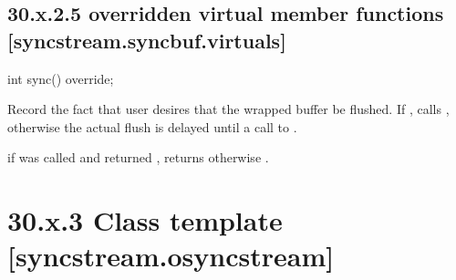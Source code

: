 \documentclass[ebook,11pt,article]{memoir}
\begin{document}
\subsection{30.x.2.5  overridden virtual member functions [syncstream.syncbuf.virtuals]}


\begin{addedblock}
\begin{itemdecl}
int sync() override;
\end{itemdecl}
\begin{itemdescr}
\pnum
\effects 
Record the fact that user desires that the wrapped buffer be flushed. 
If , calls , otherwise
the actual flush is delayed until a call to .

\pnum
\returns
if  was called and returned , returns  otherwise .
\end{itemdescr}

\end{addedblock}

\section{30.x.3 Class template  [syncstream.osyncstream] }

\end{document}
